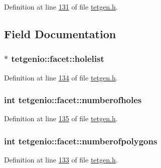 Definition at line \hyperlink{tetgen_8h_source_l00131}{131} of file \hyperlink{tetgen_8h_source}{tetgen.\+h}.



\subsection{Field Documentation}
\subsubsection[{\texorpdfstring{holelist}{holelist}}]{$\ast$ tetgenio\+::facet\+::holelist}\hypertarget{structtetgenio_1_1facet_aecc34fbcd7087b45baecf2ba43d57757}{}\label{structtetgenio_1_1facet_aecc34fbcd7087b45baecf2ba43d57757}


Definition at line \hyperlink{tetgen_8h_source_l00134}{134} of file \hyperlink{tetgen_8h_source}{tetgen.\+h}.

\subsubsection[{\texorpdfstring{numberofholes}{numberofholes}}]{\setlength{\rightskip}{0pt plus 5cm}int tetgenio\+::facet\+::numberofholes}\hypertarget{structtetgenio_1_1facet_acc9857df4007aa20199f8979353339c7}{}\label{structtetgenio_1_1facet_acc9857df4007aa20199f8979353339c7}


Definition at line \hyperlink{tetgen_8h_source_l00135}{135} of file \hyperlink{tetgen_8h_source}{tetgen.\+h}.

\subsubsection[{\texorpdfstring{numberofpolygons}{numberofpolygons}}]{\setlength{\rightskip}{0pt plus 5cm}int tetgenio\+::facet\+::numberofpolygons}\hypertarget{structtetgenio_1_1facet_a845d93a1341532b2f0de8b1e75a5d0bb}{}\label{structtetgenio_1_1facet_a845d93a1341532b2f0de8b1e75a5d0bb}


Definition at line \hyperlink{tetgen_8h_source_l00133}{133} of file \hyperlink{tetgen_8h_source}{tetgen.\+h}.


